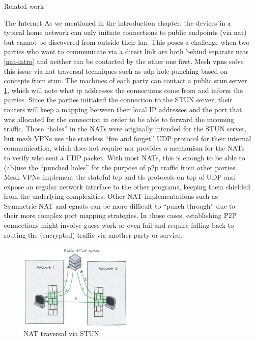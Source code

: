 \begin{frame}[fragile]{Related work}
\begin{block}{The Internet}
As we mentioned in the introduction chapter, the devices in a typical
home network can only initiate connections to public endpoints (via
\gls{nat}) but cannot be discovered from outside their \gls{lan}. This
poses a challenge when two parties who want to communicate via a direct
link are both behind separate \glspl{nat} \ref{nat-intro} and neither
can be contacted by the other one first. Mesh \glspl{vpn} solve this
issue via \gls{nat} traversal techniques such as \gls{udp} hole punching
based on concepts from \gls{stun}. The machines of each party can
contact a public \gls{stun} server \ref{nat-traversal}, which will note
what \gls{ip} addresses the connections come from and inform the
parties. Since the parties initiated the connection to the STUN server,
their routers will keep a mapping between their local IP addresses and
the port that was allocated for the connection in order to be able to
forward the incoming traffic. Those ``holes'' in the NATs were
originally intended for the STUN server, but mesh VPNs use the stateless
``fire and forget'' UDP protocol for their internal communication, which
does not require nor provides a mechanism for the NATs to verify who
sent a UDP packet. With most NATs, this is enough to be able to (ab)use
the ``punched holes'' for the purpose of \gls{p2p} traffic from other
parties. Mesh VPNs implement the stateful \gls{tcp} and \gls{tls}
protocols on top of UDP and expose an regular network interface to the
other programs, keeping them shielded from the underlying complexities.
Other NAT implementations such as Symmetric NAT and \glspl{cgnat} can be
more difficult to ``punch through'' due to their more complex port
mapping strategies. In those cases, establishing P2P connections might
involve guess work or even fail and require falling back to routing the
(encrypted) traffic via another party or service.

\begin{figure}
\centering
\includegraphics[width=0.5\textwidth,height=0.25\textheight]{thesis/../figures/nat-traversal.png}
\caption{NAT traversal via STUN\label{nat-traversal}}
\end{figure}
\end{block}


\end{frame}
